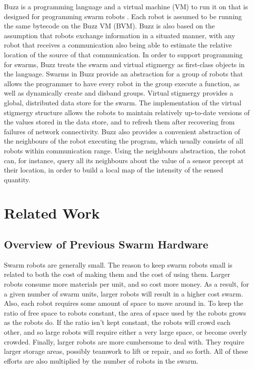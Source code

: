 Buzz is a programming language and a virtual machine (VM) to run it on that is designed for programming swarm robots \citep{PinciroliLB15}. 
Each robot is assumed to be running the same bytecode on the Buzz VM (BVM). 
Buzz is also based on the assumption that robots exchange information in a situated manner, with any robot that receives a communication also being able to estimate the relative location of the source of that communication.
In order to support programming for swarms, Buzz treats the swarm and virtual stigmergy as first-class objects in the language. 
Swarms in Buzz provide an abstraction for a group of robots that allows the programmer to have every robot in the group execute a function, as well as dynamically create and disband groups. 
Virtual stigmergy provides a global, distributed data store for the swarm. 
The implementation of the virtual stigmergy structure allows the robots to maintain relatively up-to-date versions of the values stored in the data store, and to refresh them after recovering from failures of network connectivity.
Buzz also provides a convenient abstraction of the neighbours of the robot executing the program, which usually consists of all robots within communication range. 
Using the neighbours abstraction, the robot can, for instance, query all its neighbours about the value of a sensor precept at their location, in order to build a local map of the intensity of the sensed quantity. 

\section{Related Work}

\subsection{Overview of Previous Swarm Hardware}

Swarm robots are generally small. 
The reason to keep swarm robots small is related to both the cost of making them and the cost of using them. 
Larger robots consume more materials per unit, and so cost more money.
As a result, for a given number of swarm units, larger robots will result in a higher cost swarm. 
Also, each robot requires some amount of space to move around in. 
To keep the ratio of free space to robots constant, the area of space used by the robots grows as the robots do. 
If the ratio isn't kept constant, the robots will crowd each other, and so large robots will require either a very large space, or become overly crowded.
Finally, larger robots are more cumbersome to deal with. 
They require larger storage areas, possibly teamwork to lift or repair, and so forth. 
All of these efforts are also multiplied by the number of robots in the swarm. 

